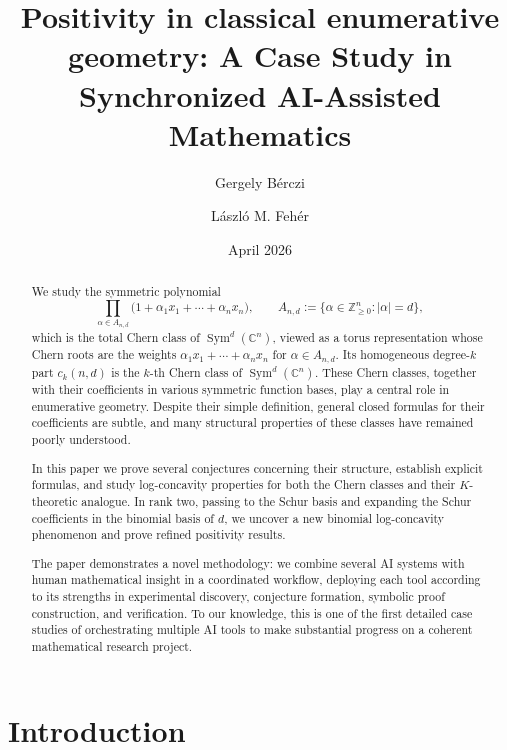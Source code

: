 \documentclass[11pt]{amsart}
\title[Positivity in classical enumerative geometry:a synchronized AI workflow]{Positivity in classical enumerative geometry: A Case Study in Synchronized AI-Assisted Mathematics}
\author{Gergely B\'erczi}
\author{L\'aszl\'o M. Feh\'er}
\date{April 2026}
\numberwithin{equation}{section}
\theoremstyle{remark}
\DeclareMathOperator{\Sym}{Sym}
\newcommand{\C}{\mathbb C}
\newcommand{\Z}{\mathbb Z}
\begin{document}
\begin{abstract}
We study the symmetric polynomial
\[
\prod_{\alpha\in A_{n,d}}\bigl(1+\alpha_1 x_1+\cdots+\alpha_n x_n\bigr),
\qquad A_{n,d}:=\{\alpha\in\Z_{\ge0}^n:|\alpha|=d\},
\]
which is the total Chern class of $\Sym^d(\C^n)$, viewed as a torus representation whose Chern roots are the weights $\alpha_1 x_1+\cdots+\alpha_n x_n$ for $\alpha\in A_{n,d}$. Its homogeneous degree-$k$ part $c_k(n,d)$ is the $k$-th Chern class of $\Sym^d(\C^n)$.  These Chern classes, together with their coefficients in various symmetric function bases, play a central role in enumerative geometry. Despite their simple definition, general closed formulas for their coefficients are subtle, and many structural properties of these classes have remained poorly understood. 

In this paper we prove several conjectures concerning their structure, establish explicit formulas, and study log-concavity properties for both the Chern classes and their $K$-theoretic analogue. In rank two, passing to the Schur basis and expanding the Schur coefficients in the binomial basis of $d$, we uncover a new binomial log-concavity phenomenon and prove refined positivity results.

The paper demonstrates a novel methodology: we combine several AI systems with human mathematical insight in a coordinated workflow, deploying each tool according to its strengths in experimental discovery, conjecture formation, symbolic proof construction, and verification. To our knowledge, this is one of the first detailed case studies of orchestrating multiple AI tools to make substantial progress on a coherent mathematical research project.
\end{abstract}

\maketitle

\section{Introduction}
\end{document}
